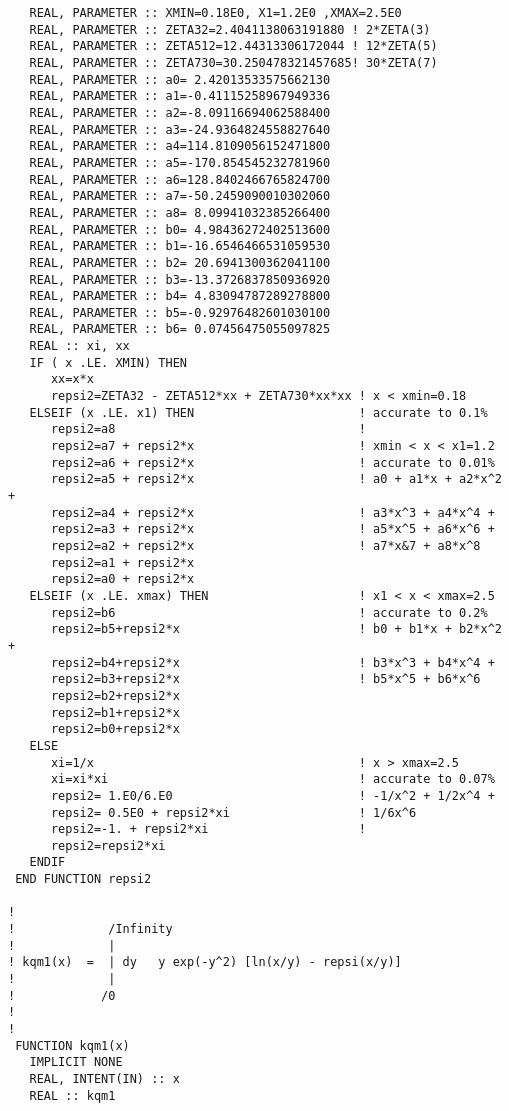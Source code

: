 \documentclass[preprint,12pt,eqsecnum,nofootinbib,amsmath,amssymb]{revtex4}
\begin{document}
{\begin{verbatim}
   REAL, PARAMETER :: XMIN=0.18E0, X1=1.2E0 ,XMAX=2.5E0
   REAL, PARAMETER :: ZETA32=2.4041138063191880 ! 2*ZETA(3)
   REAL, PARAMETER :: ZETA512=12.44313306172044 ! 12*ZETA(5)
   REAL, PARAMETER :: ZETA730=30.250478321457685! 30*ZETA(7)
   REAL, PARAMETER :: a0= 2.42013533575662130
   REAL, PARAMETER :: a1=-0.41115258967949336
   REAL, PARAMETER :: a2=-8.09116694062588400
   REAL, PARAMETER :: a3=-24.9364824558827640
   REAL, PARAMETER :: a4=114.8109056152471800
   REAL, PARAMETER :: a5=-170.854545232781960
   REAL, PARAMETER :: a6=128.8402466765824700
   REAL, PARAMETER :: a7=-50.2459090010302060 
   REAL, PARAMETER :: a8= 8.09941032385266400
   REAL, PARAMETER :: b0= 4.98436272402513600
   REAL, PARAMETER :: b1=-16.6546466531059530
   REAL, PARAMETER :: b2= 20.6941300362041100
   REAL, PARAMETER :: b3=-13.3726837850936920 
   REAL, PARAMETER :: b4= 4.83094787289278800 
   REAL, PARAMETER :: b5=-0.92976482601030100
   REAL, PARAMETER :: b6= 0.07456475055097825
   REAL :: xi, xx
   IF ( x .LE. XMIN) THEN
      xx=x*x
      repsi2=ZETA32 - ZETA512*xx + ZETA730*xx*xx ! x < xmin=0.18
   ELSEIF (x .LE. x1) THEN                       ! accurate to 0.1%
      repsi2=a8                                  !
      repsi2=a7 + repsi2*x                       ! xmin < x < x1=1.2
      repsi2=a6 + repsi2*x                       ! accurate to 0.01% 
      repsi2=a5 + repsi2*x                       ! a0 + a1*x + a2*x^2 +
      repsi2=a4 + repsi2*x                       ! a3*x^3 + a4*x^4 +
      repsi2=a3 + repsi2*x                       ! a5*x^5 + a6*x^6 +
      repsi2=a2 + repsi2*x                       ! a7*x&7 + a8*x^8 
      repsi2=a1 + repsi2*x
      repsi2=a0 + repsi2*x 
   ELSEIF (x .LE. xmax) THEN                     ! x1 < x < xmax=2.5
      repsi2=b6                                  ! accurate to 0.2%
      repsi2=b5+repsi2*x                         ! b0 + b1*x + b2*x^2 +
      repsi2=b4+repsi2*x                         ! b3*x^3 + b4*x^4 +
      repsi2=b3+repsi2*x                         ! b5*x^5 + b6*x^6
      repsi2=b2+repsi2*x          
      repsi2=b1+repsi2*x          
      repsi2=b0+repsi2*x          
   ELSE
      xi=1/x                                     ! x > xmax=2.5
      xi=xi*xi                                   ! accurate to 0.07%
      repsi2= 1.E0/6.E0                          ! -1/x^2 + 1/2x^4 + 
      repsi2= 0.5E0 + repsi2*xi                  ! 1/6x^6
      repsi2=-1. + repsi2*xi                     !
      repsi2=repsi2*xi
   ENDIF
 END FUNCTION repsi2

!
!             /Infinity
!             |
! kqm1(x)  =  | dy   y exp(-y^2) [ln(x/y) - repsi(x/y)]
!             |
!            /0
!
!
 FUNCTION kqm1(x)  
   IMPLICIT NONE
   REAL, INTENT(IN) :: x
   REAL :: kqm1


\end{verbatim}}
\end{document}

